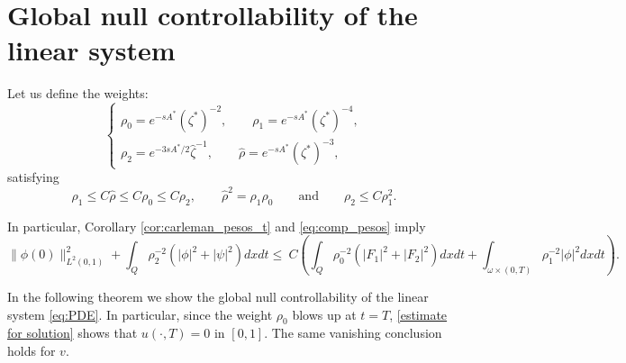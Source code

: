 \documentclass[11pt,oneside,a4papper]{osajnl}
\begin{document}
\section{Global null controllability of the linear system}
\label{sec:global_null_controllability}

Let us define the weights: 
\begin{equation}\label{eq:weights_rhos}
   \left\{ \begin{array}{l}
 \rho_0 = e^{-sA^*}  (\zeta^*)^{-2}, \qquad   \rho_1 = e^{-sA^*}  (\zeta^*)^{-4},\\  \rho_2 = e^{-3sA^*/2}  \hat \zeta^{-1},  \qquad \hat{\rho} = e^{-sA^*} (\zeta^*)^{-3},      
    \end{array}\right.
\end{equation}
satisfying
\begin{equation}\label{eq:compara_rhos}
 \rho_{1}\leq C \hat{\rho}\leq C\rho_{0}\leq C\rho_{2}, \qquad \hat{\rho}^{2}=\rho_{1}\rho_{0} \qquad \text{and} \qquad \rho_2 \leq C \rho_1^2.   
\end{equation}

In particular, Corollary \ref{cor:carleman_pesos_t} and \eqref{eq:comp_pesos} imply 
\begin{equation}
\label{eq:carleman_simples}
\|\phi(0)\|^2_{L^2(0,1)} +
\int_Q \rho_2^{-2} (|\phi|^2 + |\psi|^2)dxdt
\leq \ C \left( \int_Q \rho_0^{-2} (|F_1|^2+|F_2|^2)dxdt + \int_{\omega \times (0,T)} \rho_1^{-2} |\phi|^2 dxdt\right).
\end{equation}

In the following theorem we show the global null controllability of the linear system \eqref{eq:PDE}. In particular, since the weight $\rho_0$ blows up at $t=T$, \eqref{estimate for solution} shows that $u(\cdot,T)=0$ in $[0,1]$. The same vanishing conclusion holds for $v$.

\end{document}
